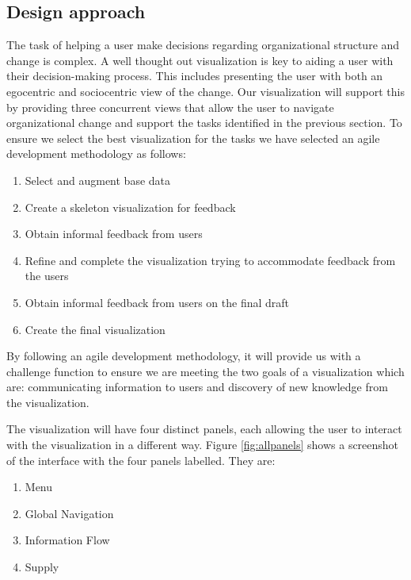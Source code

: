 \documentclass[12pt,letterpaper]{article}
\begin{document}
\subsection{Design approach}

The task of helping a user make decisions regarding organizational structure and change is complex.  A well thought out visualization is key to aiding a user with their decision-making process.  This includes presenting the user with both an egocentric and sociocentric view of the change.  Our visualization will support this by providing three concurrent views that allow the user to navigate organizational change and support the tasks identified in the previous section.  To ensure we select the best visualization for the tasks we have selected an agile development methodology as follows:

\begin{enumerate}
\item Select and augment base data
\item Create a skeleton visualization for feedback
\item Obtain informal feedback from users
\item Refine and complete the visualization trying to accommodate feedback from the users
\item Obtain informal feedback from users on the final draft
\item Create the final visualization
\end{enumerate}

By following an agile development methodology, it will provide us with a challenge function to ensure we are meeting the two goals of a visualization which are: communicating information to users and discovery of new knowledge from the visualization. 

The visualization will have four distinct panels, each allowing the user to interact with the visualization in a different way. Figure \ref{fig:allpanels} shows a screenshot of the interface with the four panels labelled. They are:
\begin{enumerate}
\item Menu
\item Global Navigation
\item Information Flow
\item Supply
\end{enumerate}
\end{document}
